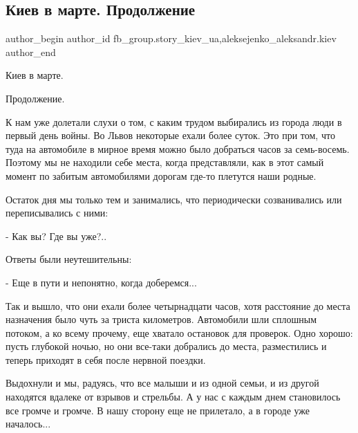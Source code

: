  
 
 
 
 
 
\subsection{Киев в марте. Продолжение}
\label{sec:24_04_2022.fb.fb_group.story_kiev_ua.1.kiev_v_marte_prodolzhenie}
 
\ifcmt
 author_begin
   author_id fb_group.story_kiev_ua,aleksejenko_aleksandr.kiev
 author_end
\fi

Киев в марте.

Продолжение.

К нам уже долетали слухи о том, с каким трудом выбирались из города люди в
первый день войны. Во Львов некоторые ехали более суток. Это при том, что туда
на автомобиле в мирное время можно было добраться часов за семь-восемь. Поэтому
мы не находили себе места, когда представляли, как в этот самый момент по
забитым автомобилями дорогам где-то плетутся наши родные.

Остаток дня мы только тем и занимались, что периодически созванивались или
переписывались с ними:

- Как вы? Где вы уже?..

Ответы были неутешительны:

- Еще в пути и непонятно, когда доберемся...

Так и вышло, что они ехали более четырнадцати часов, хотя расстояние до места
назначения было чуть за триста километров. Автомобили шли сплошным потоком, а
ко всему прочему, еще хватало остановок для проверок. Одно хорошо: пусть
глубокой ночью, но они все-таки добрались до места, разместились и теперь
приходят в себя после нервной поездки.

Выдохнули и мы, радуясь, что все малыши и из одной семьи, и из другой находятся
вдалеке от взрывов и стрельбы. А у нас с каждым днем становилось все громче и
громче. В нашу сторону еще не прилетало, а в городе уже началось...

